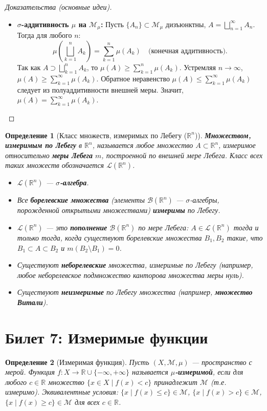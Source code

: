 \documentclass[a4paper, 12pt]{article}
\newtheorem{definition}{Определение}
\newcommand{\R}{\mathbb{R}}
\newcommand{\B}{\mathcal{B}}
\newcommand{\Leb}{\mathcal{L}}
\newcommand{\1}{\mathbf{1}}
\begin{document}
\begin{proof}[Доказательства (основные идеи)]
\begin{itemize}
        \item \textbf{$\sigma$-аддитивность $\mu$ на $\mathcal{M}_{\mu}$:} Пусть $\{A_n\} \subset \mathcal{M}_{\mu}$ дизъюнктны, $A = \bigsqcup_{n=1}^{\infty} A_n$. Тогда для любого $n$:
        \[
        \mu(\bigsqcup_{k=1}^n A_k) = \sum_{k=1}^n \mu(A_k) \quad \text{(конечная аддитивность)}.
        \]
        Так как $A \supset \bigsqcup_{k=1}^n A_k$, то $\mu(A) \geq \sum_{k=1}^n \mu(A_k)$. Устремляя $n \to \infty$, $\mu(A) \geq \sum_{k=1}^{\infty} \mu(A_k)$. Обратное неравенство $\mu(A) \leq \sum_{k=1}^{\infty} \mu(A_k)$ следует из полуаддитивности внешней меры. Значит, $\mu(A) = \sum_{k=1}^{\infty} \mu(A_k)$.
    \end{itemize}
\end{proof}

\begin{definition}[Класс множеств, измеримых по Лебегу ($\R^n$)]
    \textbf{Множеством, измеримым по Лебегу} в $\R^n$, называется любое множество $A \subset \R^n$, измеримое относительно \textbf{меры Лебега} $m$, построенной по внешней мере Лебега. Класс всех таких множеств обозначается $\Leb(\R^n)$.
    \begin{itemize}
        \item $\Leb(\R^n)$ — \textbf{$\sigma$-алгебра}.
        \item Все \textbf{борелевские множества} (элементы $\B(\R^n)$ — $\sigma$-алгебры, порожденной открытыми множествами) \textbf{измеримы} по Лебегу.
        \item $\Leb(\R^n)$ — это \textbf{пополнение} $\B(\R^n)$ по мере Лебега: $A \in \Leb(\R^n)$ тогда и только тогда, когда существуют борелевские множества $B_1, B_2$ такие, что $B_1 \subset A \subset B_2$ и $m(B_2 \setminus B_1) = 0$.
        \item Существуют \textbf{неборелевские} множества, измеримые по Лебегу (например, любое неборелевское подмножество канторова множества меры нуль).
        \item Существуют \textbf{неизмеримые} по Лебегу множества (например, \textbf{множество Витали}).
    \end{itemize}
\end{definition}

\section*{Билет 7: Измеримые функции}
\begin{definition}[Измеримая функция]
    Пусть $(X, \mathcal{M}, \mu)$ — пространство с мерой. Функция $f: X \to \R \cup \{-\infty, +\infty\}$ называется \textbf{$\mu$-измеримой}, если для любого $c \in \R$ множество $\{x \in X \mid f(x) < c\}$ принадлежит $\mathcal{M}$ (т.е. измеримо).
    \textit{Эквивалентные условия:} $\{x \mid f(x) \leq c\} \in \mathcal{M}$, $\{x \mid f(x) > c\} \in \mathcal{M}$, $\{x \mid f(x) \geq c\} \in \mathcal{M}$ для всех $c \in \R$.
\end{definition}
\end{document}
